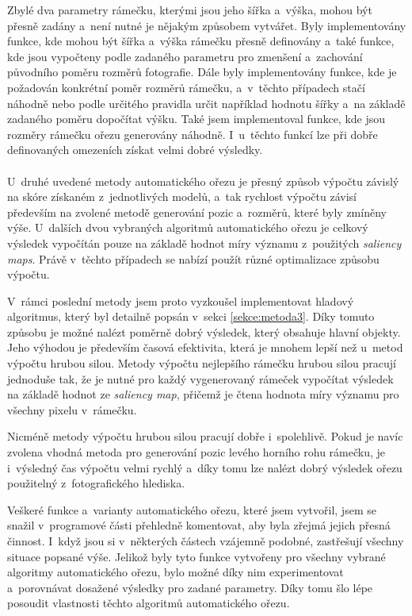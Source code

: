 Zbylé dva parametry rámečku, kterými jsou jeho šířka a~výška, mohou být přesně zadány a~není nutné je nějakým způsobem vytvářet. Byly implementovány funkce, kde mohou být šířka a~výška rámečku přesně definovány a~také funkce, kde jsou vypočteny podle zadaného parametru pro zmenšení a~zachování původního poměru rozměrů fotografie. Dále byly implementovány funkce, kde je požadován konkrétní poměr rozměrů rámečku, a~v~těchto případech stačí náhodně nebo podle určitého pravidla určit například hodnotu šířky a~na základě zadaného poměru dopočítat výšku. Také jsem implementoval funkce, kde jsou rozměry rámečku ořezu generovány náhodně. I~u~těchto funkcí lze při dobře definovaných omezeních získat velmi dobré výsledky.

\paragraph{}
U~druhé uvedené metody automatického ořezu \cite{Fang2014} je přesný způsob výpočtu závislý na skóre získaném z~jednotlivých modelů, a~tak rychlost výpočtu závisí především na zvolené metodě generování pozic a~rozměrů, které byly zmíněny výše. U~dalších dvou vybraných algoritmů automatického ořezu \cite{Stentiford2007,Suh2003} je celkový výsledek vypočítán pouze na základě hodnot míry významu z~použitých \emph{saliency maps}. Právě v~těchto případech se nabízí použít různé optimalizace způsobu výpočtu.

V~rámci poslední metody jsem proto vyzkoušel implementovat hladový algoritmus, který byl detailně popsán v~sekci \ref{sekce:metoda3}. Díky tomuto způsobu je možné nalézt poměrně dobrý výsledek, který obsahuje hlavní objekty. Jeho výhodou je především časová efektivita, která je mnohem lepší než u~metod výpočtu hrubou silou. Metody výpočtu nejlepšího rámečku hrubou silou pracují jednoduše tak, že je nutné pro každý vygenerovaný rámeček vypočítat výsledek na základě hodnot ze \emph{saliency map}, přičemž je čtena hodnota míry významu pro všechny pixelu v~rámečku.

Nicméně metody výpočtu hrubou silou pracují dobře i~spolehlivě. Pokud je navíc zvolena vhodná metoda pro generování pozic levého horního rohu rámečku, je i~výsledný čas výpočtu velmi rychlý a~díky tomu lze nalézt dobrý výsledek ořezu použitelný z~fotografického hlediska.

Veškeré funkce a~varianty automatického ořezu, které jsem vytvořil, jsem se snažil v~programové části přehledně komentovat, aby byla zřejmá jejich přesná činnost. I~když jsou si v~některých částech vzájemně podobné, zastřešují všechny situace popsané výše. Jelikož byly tyto funkce vytvořeny pro všechny vybrané algoritmy automatického ořezu, bylo možné díky nim experimentovat a~porovnávat dosažené výsledky pro zadané parametry. Díky tomu šlo lépe posoudit vlastnosti těchto algoritmů automatického ořezu.
\newpage

